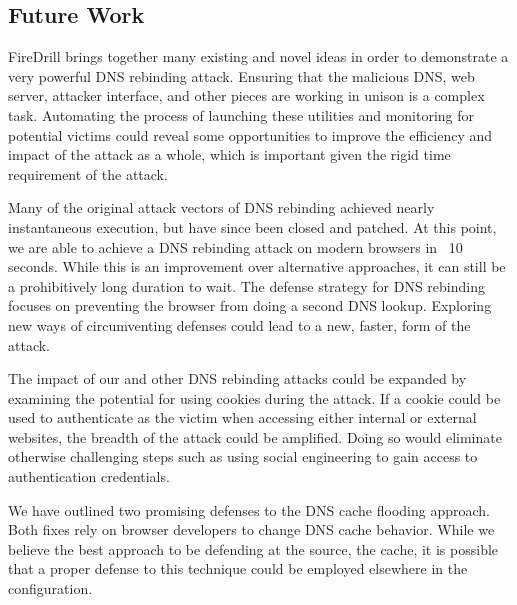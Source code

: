 \subsection{Future Work}

FireDrill brings together many existing and novel ideas in order to demonstrate a very powerful DNS rebinding attack.
Ensuring that the malicious DNS, web server, attacker interface, and other pieces are working in unison is a complex task. 
Automating the process of launching these utilities and monitoring for potential victims could reveal some opportunities to improve the efficiency and impact of the attack as a whole, which is important given the rigid time requirement of the attack.

Many of the original attack vectors of DNS rebinding achieved nearly instantaneous execution, but have since been closed and patched.
At this point, we are able to achieve a DNS rebinding attack on modern browsers in ~10 seconds. While this is an improvement over alternative approaches, it can still be a prohibitively long duration to wait.
The defense strategy for DNS rebinding focuses on preventing the browser from doing a second DNS lookup. 
Exploring new ways of circumventing defenses could lead to a new, faster, form of the attack.

The impact of our and other DNS rebinding attacks could be expanded by examining the potential for using cookies during the attack.
If a cookie could be used to authenticate as the victim when accessing either internal or external websites, the breadth of the attack could be amplified. 
Doing so would eliminate otherwise challenging steps such as using social engineering to gain access to authentication credentials.

We have outlined two promising defenses to the DNS cache flooding approach. 
Both fixes rely on browser developers to change DNS cache behavior. 
While we believe the best approach to be defending at the source, the cache, it is possible that a proper defense to this technique could be employed elsewhere in the configuration.




